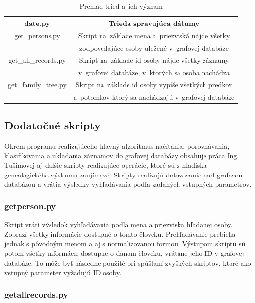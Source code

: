 \begin {table}[ht]
\begin{center}
\begin{tabular}{ |c|c|}
 date.py                         & Trieda spravujúca dátumy \\ \hline
 get\_persons.py                 & Skript na~základe mena a~priezviská nájde všetky   \\                             
                                 & zodpovedajúce osoby uložené v~grafovej databáze\\  \hline
 get\_all\_records.py            & Skript na~základe id osoby nájde všetky záznamy \\
                                 & v~grafovej databáze, v~ktorých sa osoba nachádza \\ \hline
 get\_family\_tree.py            & Skript na~základe id osoby vypíše všetkých predkov  \\ 
                                 & a~potomkov ktorý sa nachádzajú v~grafovej databáze\\ 
\hline
\end{tabular}
\caption {Prehľad tried a~ich význam} \label{triedy}
\end{center}
\end {table}

\subsection{Dodatočné skripty}

Okrem programu realizujúceho hlavný algoritmus načítania, porovnávania, klasifikovania
a ukladania záznamov do grafovej databázy obsahuje práca Ing. Tušimovej aj ďalšie skripty
realizujúce operácie, ktoré sú z hľadiska genealogického výskumu zaujímavé. Skripty
realizujú dotazovanie nad grafovou databázou a vrátia výsledky vyhľadávania podľa
zadaných vstupných parametrov.

\subsubsection{get\textunderscore person.py}
Skript vráti výsledok vyhľadávania podľa mena a priezviska hľadanej osoby. Zobrazí všetky
informácie dostupné o tomto človeku. Prehľadávanie prebieha jednak s pôvodným menom
a aj s normalizovanou formou. Výstupom skriptu sú potom všetky informácie dostupné o danom človeku, vrátane jeho ID v grafovej databáze. To môže byť následne použité pri spúšťaní zvyšných skriptov, ktoré ako vstupný parameter vyžadujú ID osoby.

\subsubsection{get\textunderscore all\textunderscore records.py}

